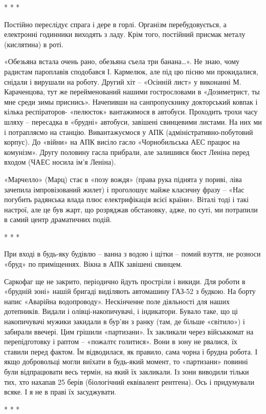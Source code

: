 * * *

Постійно переслідує спрага і дере в горлі. Організм перебудовується, а
електронні годинники виходять з ладу. Крім того, постійний присмак металу
(кислятина) в роті.

«Обезьяна встала очень рано, обезьяна съела три банана…». Не знаю, чому
радистам пароплавів сподобався І. Кармелюк, але під цю пісню ми прокидалися,
снідали і вирушали на роботу. Другий хіт – «Осінній лист» у виконанні М.
Караченцова, тут же перейменований нашими гострословами в «Дозиметрист, ты мне
среди зимы приснись». Начепивши на санпропускнику докторський ковпак і кілька
респіраторов- «пелюсток» вантажимося в автобуси. Проходить трохи часу шляху –
пересадка в «брудні» автобуси, завішені свинцевими листами. На них ми і
потрапляємо на станцію. Вивантажуємося у АПК (адміністративно-побутовий
корпус). До «війни» на АПК висіло гасло «Чорнобильська АЕС працює на комунізм».
Другу половину гасла прибрали, але залишився бюст Леніна перед входом (ЧАЕС
носила ім'я Леніна).

«Марчелло» (Марц) стає в «позу вождя» (права рука піднята у пориві, ліва
зачепила імпровізований жилет) і проголошує майже класичну фразу – «Нас
погубить радянська влада плюс електрифікація всієї країни». Віталі тоді і такі
настрої, але це був жарт, що розряджав обстановку, адже, по суті, ми потрапили
в самий центр драматичних подій.

* * *

При вході в будь-яку будівлю – ванна з водою і щітки – помий взуття, не розноси
«бруд» по приміщеннях. Вікна в АПК завішені свинцем.

Саркофаг ще не закрито, періодично йдуть простріли і викиди. Для роботи в
«брудній зоні» нашій бригаді виділяють автомашину ГАЗ-52 з будкою. На борту
напис «Аварійна водопроводу». Нескінченне поле діяльності для наших дотепників.
Видали і олівці-накопичувачі, і індикатори. Бувало таке, що ці накопичувачі
мужики закидали в бур'ян з ранку (там, де більше «світило») і забирали ввечері.
Цим грішили «партизани». Їх закликали через військкомат на перепідготовку і
раптом – «пожалтє голитися». Вони в зону не рвалися, їх ставили перед фактом.
Їм відводилася, як правило, сама чорна і брудна робота. І якщо добровольці
могли виїхати в будь-який момент, то «партизани» повинні були відпрацювати весь
термін, на який їх закликали. Із зони виводили тільки тих, хто нахапав 25 берів
(біологічний еквівалент рентгена). Ось і придумували всяке. І я не в праві їх
засуджувати.

* * *

